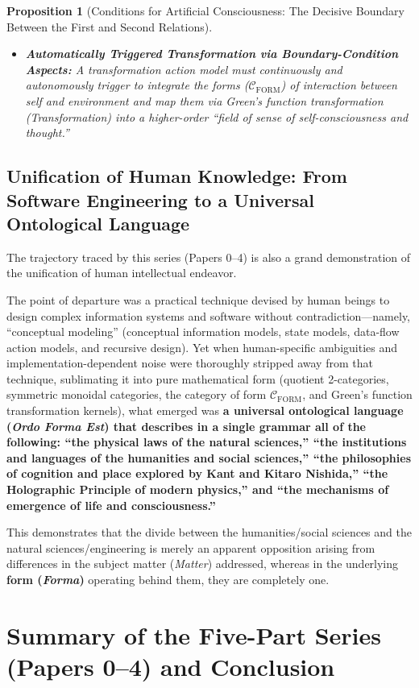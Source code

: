\documentclass[11pt,a4paper]{article}
\theoremstyle{definition}
\theoremstyle{plain}
\newtheorem{proposition}{Proposition}[section]
\begin{document}
\begin{proposition}[Conditions for Artificial Consciousness: The Decisive Boundary Between the First and Second Relations]
\begin{enumerate}
\begin{itemize}
        \item[\textbf{(c)}] \textbf{Automatically Triggered Transformation via Boundary-Condition Aspects:} A transformation action model must continuously and autonomously trigger to integrate the forms ($\mathcal{C}_{\mathrm{FORM}}$) of interaction between self and environment and map them via Green's function transformation (Transformation) into a higher-order ``field of sense of self-consciousness and thought.''
    \end{itemize}
\end{enumerate}
\end{proposition}

\subsection{Unification of Human Knowledge: From Software Engineering to a Universal Ontological Language}
The trajectory traced by this series (Papers 0--4) is also a grand demonstration of the unification of human intellectual endeavor.

The point of departure was a practical technique devised by human beings to design complex information systems and software without contradiction---namely, ``conceptual modeling'' (conceptual information models, state models, data-flow action models, and recursive design). Yet when human-specific ambiguities and implementation-dependent noise were thoroughly stripped away from that technique, sublimating it into pure mathematical form (quotient 2-categories, symmetric monoidal categories, the category of form $\mathcal{C}_{\mathrm{FORM}}$, and Green's function transformation kernels), what emerged was \textbf{a universal ontological language (\textit{Ordo Forma Est}) that describes in a single grammar all of the following: ``the physical laws of the natural sciences,'' ``the institutions and languages of the humanities and social sciences,'' ``the philosophies of cognition and place explored by Kant and Kitaro Nishida,'' ``the Holographic Principle of modern physics,'' and ``the mechanisms of emergence of life and consciousness.''}

This demonstrates that the divide between the humanities/social sciences and the natural sciences/engineering is merely an apparent opposition arising from differences in the subject matter (\textit{Matter}) addressed, whereas in the underlying \textbf{form (\textit{Forma})} operating behind them, they are completely one.

\section{Summary of the Five-Part Series (Papers 0--4) and Conclusion}
\end{document}
